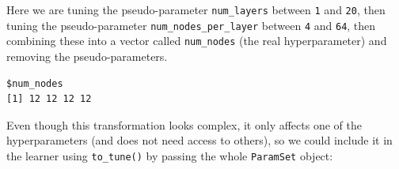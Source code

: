 \begin{Shaded}
\begin{Highlighting}[]
\OtherTok{=} \NormalTok{(}
   \NormalTok{(} \NormalTok{, } \NormalTok{),}
   \NormalTok{(}\NormalTok{, }\NormalTok{),}
   
\SpecialCharTok{$}\OtherTok{=} \SpecialCharTok{$}\SpecialCharTok{$}
\SpecialCharTok{$}\OtherTok{=} 
\SpecialCharTok{$}\OtherTok{=} 
\NormalTok{  \}}
\NormalTok{)}
\end{Highlighting}
\end{Shaded}

Here we are tuning the pseudo-parameter \texttt{num\_layers} between
\texttt{1} and \texttt{20}, then tuning the pseudo-parameter
\texttt{num\_nodes\_per\_layer} between \texttt{4} and \texttt{64}, then
combining these into a vector called \texttt{num\_nodes} (the real
hyperparameter) and removing the pseudo-parameters.

\begin{Shaded}
\begin{Highlighting}[]
\SpecialCharTok{$}\NormalTok{(}\NormalTok{(} \NormalTok{, } \NormalTok{))}
\end{Highlighting}
\end{Shaded}

\begin{verbatim}
$num_nodes
[1] 12 12 12 12
\end{verbatim}

Even though this transformation looks complex, it only affects one of
the hyperparameters (and does not need access to others), so we could
include it in the learner using \texttt{to\_tune()} by passing the whole
\texttt{ParamSet} object:

\begin{Shaded}
\begin{Highlighting}[]
\OtherTok{=} \NormalTok{(}\NormalTok{)}
\SpecialCharTok{$}\SpecialCharTok{$}\NormalTok{(} 
\SpecialCharTok{$}\SpecialCharTok{$}\NormalTok{()}
\end{Highlighting}
\end{Shaded}

